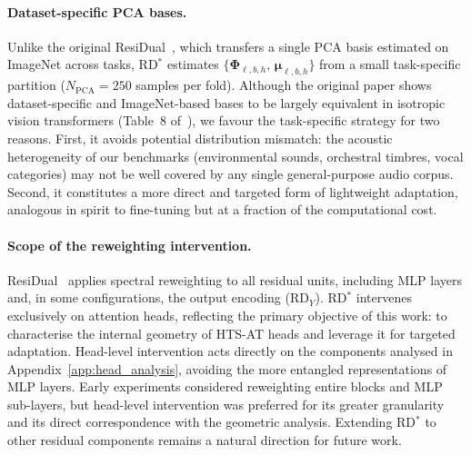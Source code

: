 \paragraph{Dataset-specific PCA bases.}

Unlike the original ResiDual~\cite{residual2024}, which transfers a 
single PCA basis estimated on ImageNet across tasks, RD$^*$\xspace estimates 
$\{\boldsymbol{\Phi}_{\ell,b,h},\, \boldsymbol{\mu}_{\ell,b,h}\}$ from 
a small task-specific partition ($N_{\mathrm{PCA}} = 250$ samples per 
fold). Although the original paper shows dataset-specific and 
ImageNet-based bases to be largely equivalent in isotropic vision 
transformers (Table~8 of~\cite{residual2024}), we favour the 
task-specific strategy for two reasons. First, it avoids potential 
distribution mismatch: the acoustic heterogeneity of our benchmarks 
(environmental sounds, orchestral timbres, vocal categories) may not be 
well covered by any single general-purpose audio corpus. Second, it 
constitutes a more direct and targeted form of lightweight adaptation, 
analogous in spirit to fine-tuning but at a fraction of the 
computational cost.

\paragraph{Scope of the reweighting intervention.}

ResiDual~\cite{residual2024} applies spectral reweighting to all 
residual units, including MLP layers and, in some configurations, the 
output encoding ($\mathrm{RD}_Y$). RD$^*$\xspace intervenes exclusively on 
attention heads, reflecting the primary objective of this work: to 
characterise the internal geometry of HTS-AT heads and leverage it for 
targeted adaptation. Head-level intervention acts directly on the 
components analysed in Appendix~\ref{app:head_analysis}, avoiding the 
more entangled representations of MLP layers. Early experiments 
considered reweighting entire blocks and MLP sub-layers, but head-level 
intervention was preferred for its greater granularity and its direct 
correspondence with the geometric analysis. Extending RD$^*$\xspace to other 
residual components remains a natural direction for future work.


